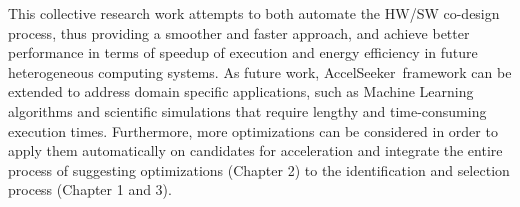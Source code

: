 \documentclass[]{usiinfthesis}
\newcommand{\aseeker}{{AccelSeeker}}
\newcommand{\htsf}{{H.264}}
\begin{document}
This collective research work attempts to both automate the HW/SW co-design process, thus providing a smoother and faster approach, and achieve better performance in terms of speedup of execution and energy efficiency in future heterogeneous computing systems. As future work, 
\aseeker\ framework can be extended to address domain specific applications, such as Machine
Learning algorithms and scientific  simulations that require lengthy and time-consuming
execution times. Furthermore, more optimizations can be considered in order to apply them 
automatically on candidates for acceleration and integrate the entire process of suggesting optimizations (Chapter 2) to the identification and selection process (Chapter 1 and 3).



\backmatter


%

%
%


%
%
%
\end{document}
